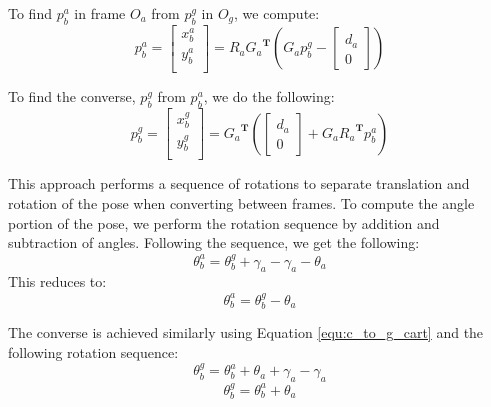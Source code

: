 To find $p_b^a$ in frame $O_a$ from $p_b^g$ in $O_g$, we compute:
\begin{equation}
\label{equ:g_to_c_cart}
p_b^a =
\begin{bmatrix}
x_b^a \\
y_b^a \\
\end{bmatrix}
 = R_a {G_a}^{\mathbf{T}} \left(G_a p_b^g 
-
\begin{bmatrix}
d_a \\
0
\end{bmatrix}
\right)
\end{equation}

To find the converse, $p_b^g$ from $p_b^a$, we do the following:
\begin{equation}
\label{equ:c_to_g_cart}
p_b^g =
\begin{bmatrix}
x_b^g \\
y_b^g \\
\end{bmatrix}
 = {G_a}^{\mathbf{T}} \left(
\begin{bmatrix}
d_a \\
0
\end{bmatrix}
+ G_a {R_a}^{\mathbf{T}} p_b^a \right)
\end{equation}

This approach performs a sequence of rotations to separate translation and rotation of the pose when converting between frames.  To compute the angle portion of the pose, we perform the rotation sequence by addition and subtraction of angles.  Following the sequence, we get the following: 
\begin{equation*}
\theta^a_b = \theta_b^g + \gamma_a - \gamma_a - \theta_a
\end{equation*}
This reduces to:
\begin{equation}
\label{equ:g_to_c_ori}
\theta^a_b = \theta_b^g - \theta_a
\end{equation}

The converse is achieved similarly using Equation \ref{equ:c_to_g_cart} and the following rotation sequence:
\begin{equation*}
\theta_b^g = \theta_b^a + \theta_a + \gamma_a - \gamma_a 
\end{equation*}
\begin{equation}
\label{equ:c_to_g_ori}
\theta_b^g = \theta_b^a + \theta_a
\end{equation}

